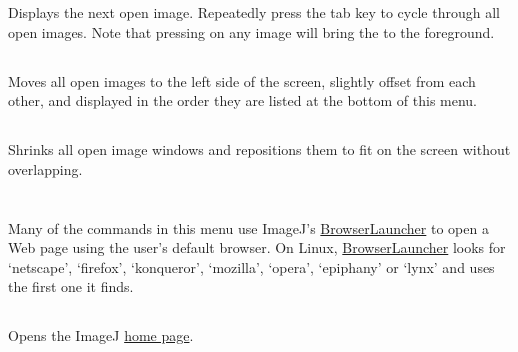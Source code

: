 Displays the next open image. Repeatedly press the tab key to cycle
through all open images. Note that pressing  on
any image will bring the  to the foreground.




\subsection{\protect{}}

Moves all open images to the left side of the screen, slightly offset
from each other, and displayed in the order they are listed at the
bottom of this menu. 


\subsection{\protect{}}

Shrinks all open image windows and repositions them to fit on the
screen without overlapping.

\clearpage{}


\section{\protect{}\label{sec:Help}}

Many of the commands in this menu use ImageJ's \href{http://imagej.nih.gov/ij/developer/source/ij/plugin/BrowserLauncher.java.html}{BrowserLauncher}
to open a Web page using the user's default browser.
On Linux, \href{http://imagej.nih.gov/ij/developer/source/ij/plugin/BrowserLauncher.java.html}{BrowserLauncher}
looks for `netscape', `firefox', `konqueror', `mozilla', `opera',
`epiphany' or `lynx' and uses the first one it finds. 


\subsection{\protect{}}

Opens the ImageJ \href{http://imagej.nih.gov/ij/}{home page}.


\subsection{\protect{}\label{sub:ImageJ-News...}}

